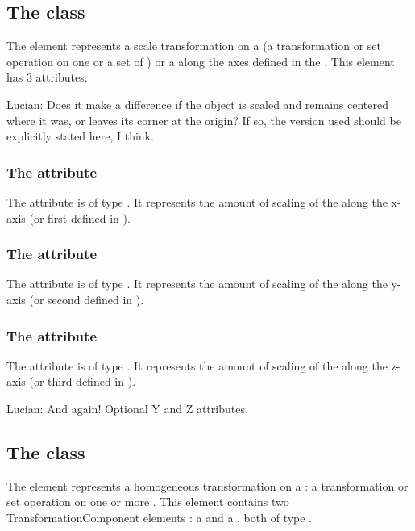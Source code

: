 \subsection{The  class}
\label{CSGScale-class}
The \CSGScale element represents a scale transformation on a \CSGNode (a transformation or set operation on one or a set of \CSGPrimitives) or a \CSGPrimitive along the axes defined in the \Geometry. This element has 3 attributes:

{\color{red} Lucian: \notice Does it make a difference if the object is scaled and remains centered where it was, or leaves its corner at the origin?  If so, the version used should be explicitly stated here, I think.}

\subsubsection{The  attribute}
The  attribute is of type . It represents the amount of scaling of the \CSGNode along the x-axis (or first \CoordinateComponent defined in \Geometry).

\subsubsection{The  attribute}
The  attribute is of type . It represents the amount of scaling of the \CSGNode along the y-axis (or second \CoordinateComponent defined in \Geometry).

\subsubsection{The  attribute}
The  attribute is of type . It represents the amount of scaling of the \CSGNode along the z-axis (or third \CoordinateComponent defined in \Geometry).

{\color{red} Lucian: \notice And again!  Optional Y and Z attributes.}

\subsection{The  class}
\label{CSGHomogeneousTransformation-class}
The \CSGHomogeneousTransformation element represents a homogeneous transformation on a \CSGNode: a transformation or set operation on one or more \CSGPrimitives. This element contains two TransformationComponent elements : a  and a , both of type \TransformationComponent.


